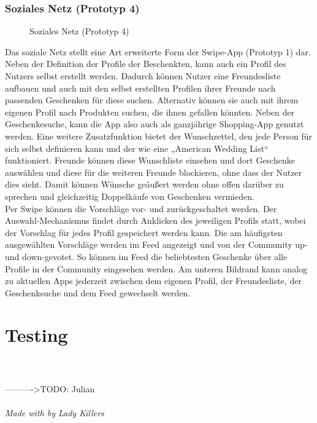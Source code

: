 \documentclass[12pt,ngerman, fleqn]{book} %
\begin{document}
\subsection{Soziales Netz (Prototyp 4)}
\begin{figure}[ht]
    \centering
    \caption{Soziales Netz (Prototyp 4)}
    \label{fig:proto4}
\end{figure}

Das soziale Netz stellt eine Art erweiterte Form der Swipe-App (Prototyp 1) dar. Neben der Definition der Profile der Beschenkten, kann auch ein Profil des Nutzers selbst erstellt werden. Dadurch können Nutzer eine Freundesliste aufbauen und auch mit den selbst erstellten Profilen ihrer Freunde nach passenden Geschenken für diese suchen. Alternativ können sie auch mit ihrem eigenen Profil nach Produkten suchen, die ihnen gefallen könnten. Neben der Geschenkesuche, kann die App also auch als ganzjährige Shopping-App genutzt werden. Eine weitere Zusatzfunktion bietet der Wunschzettel, den jede Person für sich selbst definieren kann und der wie eine „American Wedding List“ funktioniert. Freunde können diese Wunschliste einsehen und dort Geschenke auswählen und diese für die weiteren Freunde blockieren, ohne dass der Nutzer dies sieht. Damit können Wünsche geäußert werden ohne offen darüber zu sprechen und gleichzeitig Doppelkäufe von Geschenken vermieden.\\

Per Swipe können die Vorschläge vor- und zurückgeschaltet werden. Der Auswahl-Mechanismus findet durch Anklicken des jeweiligen Profils statt, wobei der Vorschlag für jedes Profil gespeichert werden kann. Die am häufigsten ausgewählten Vorschläge werden im Feed angezeigt und von der Community up- und down-gevotet. So können im Feed die beliebtesten Geschenke über alle Profile in der Community eingesehen werden. Am unteren Bildrand kann analog zu aktuellen Apps jederzeit zwischen dem eigenen Profil, der Freundesliste, der Geschenksuche und dem Feed gewechselt werden. 

\chapter{Testing}
\\\\---------->TODO: Julian\\\\

\vfill
\textit{Made with  by Lady Killers} \autocite{acknow}

\appendix

\end{document}
